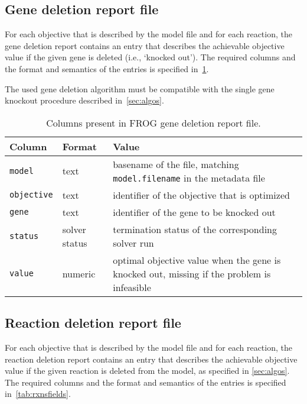 \subsection{Gene deletion report file}
\label{sec:genes}

For each objective that is described by the model file and for each reaction, the gene deletion report contains an entry that describes the achievable objective value if the given gene is deleted (i.e., `knocked out'). The required columns and the format and semantics of the entries is specified in~\cref{tab:genefields}.

The used gene deletion algorithm must be compatible with the single gene knockout procedure described in~\cref{sec:algos}.

\begin{table}\tablefont
\begin{tabular}{llp{30em}}
\toprule
Column & Format & Value \\
\midrule
\verb|model|
 & text
 & basename of the file, matching \verb|model.filename| in the metadata file
 \\
\verb|objective|
 & text
 & identifier of the objective that is optimized
 \\
\verb|gene|
 & text
 & identifier of the gene to be knocked out
 \\
\verb|status|
 & solver status
 & termination status of the corresponding solver run
 \\
\verb|value|
 & numeric
 & optimal objective value when the gene is knocked out, missing if the problem is infeasible
 \\
\bottomrule
\end{tabular}
\caption{Columns present in FROG gene deletion report file.}
\label{tab:genefields}
\end{table}

\subsection{Reaction deletion report file}
\label{sec:rxns}

For each objective that is described by the model file and for each reaction, the reaction deletion report contains an entry that describes the achievable objective value if the given reaction is deleted from the model, as specified in \cref{sec:algos}. The required columns and the format and semantics of the entries is specified in~\cref{tab:rxnsfields}.

